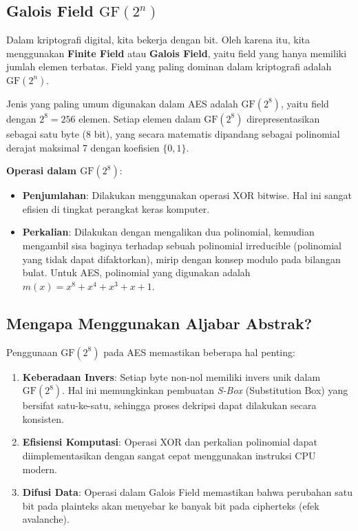 \subsection{Galois Field $\mathrm{GF}(2^n)$}

Dalam kriptografi digital, kita bekerja dengan bit. Oleh karena itu, kita menggunakan \textbf{Finite Field} atau \textbf{Galois Field}, yaitu field yang hanya memiliki jumlah elemen terbatas. Field yang paling dominan dalam kriptografi adalah $\mathrm{GF}(2^n)$.

Jenis yang paling umum digunakan dalam AES adalah $\mathrm{GF}(2^8)$, yaitu field dengan $2^8 = 256$ elemen. Setiap elemen dalam $\mathrm{GF}(2^8)$ direpresentasikan sebagai satu byte (8 bit), yang secara matematis dipandang sebagai polinomial derajat maksimal 7 dengan koefisien $\{0, 1\}$.

\textbf{Operasi dalam $\mathrm{GF}(2^8)$}:
\begin{itemize}
    \item \textbf{Penjumlahan}: Dilakukan menggunakan operasi XOR bitwise. Hal ini sangat efisien di tingkat perangkat keras komputer.
    \item \textbf{Perkalian}: Dilakukan dengan mengalikan dua polinomial, kemudian mengambil sisa baginya terhadap sebuah polinomial irreducible (polinomial yang tidak dapat difaktorkan), mirip dengan konsep modulo pada bilangan bulat. Untuk AES, polinomial yang digunakan adalah $m(x) = x^8 + x^4 + x^3 + x + 1$.
\end{itemize}

\subsection{Mengapa Menggunakan Aljabar Abstrak?}

Penggunaan $\mathrm{GF}(2^8)$ pada AES memastikan beberapa hal penting:
\begin{enumerate}
    \item \textbf{Keberadaan Invers}: Setiap byte non-nol memiliki invers unik dalam $\mathrm{GF}(2^8)$. Hal ini memungkinkan pembuatan \textit{S-Box} (Substitution Box) yang bersifat satu-ke-satu, sehingga proses dekripsi dapat dilakukan secara konsisten.
    \item \textbf{Efisiensi Komputasi}: Operasi XOR dan perkalian polinomial dapat diimplementasikan dengan sangat cepat menggunakan instruksi CPU modern.
    \item \textbf{Difusi Data}: Operasi dalam Galois Field memastikan bahwa perubahan satu bit pada plainteks akan menyebar ke banyak bit pada cipherteks (efek avalanche).
\end{enumerate}
